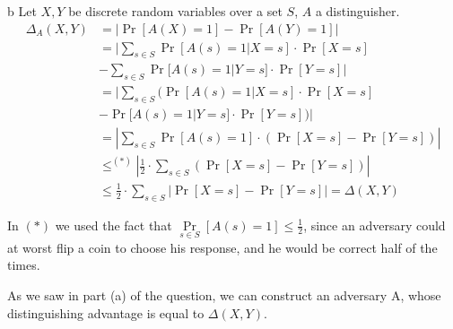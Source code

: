 \documentclass{article}
\begin{document}
\begin{paragraph}
	b Let $X, Y$ be discrete random variables over a set $S$, $A$ a distinguisher.
	\begin{align*}
		\Delta_A(X, Y) & = |\Pr[A(X) = 1] - \Pr[A(Y) = 1]|                                                    \\
		               & =|\sum\limits_{s \in S}\Pr[A(s) = 1| X = s] \cdot \Pr[X = s]                         \\
		               & - \sum\limits_{s \in S}\Pr[A(s) = 1| Y = s] \cdot \Pr[Y = s]|                        \\
		               & =|\sum\limits_{s \in S}(\Pr[A(s) = 1 | X = s] \cdot \Pr[X = s]                       \\
		               & - \Pr[A(s) = 1 | Y = s] \cdot \Pr[Y = s])|                                           \\
		               & =|\sum\limits_{s \in S}\Pr[A(s) = 1] \cdot \left(\Pr[X = s] - \Pr[Y = s]\right)|     \\
		               & \leq^{(*)} |\frac{1}{2} \cdot \sum\limits_{s \in S}(\Pr[X = s] - \Pr[Y = s])|        \\
		               & \leq \frac{1}{2} \cdot \sum\limits_{s \in S}|\Pr[X = s] - \Pr[Y = s]| = \Delta(X, Y)
	\end{align*}

	In $(*)$ we used the fact that $\Pr\limits_{s \in S}[A(s) = 1] \leq \frac{1}{2}$, since an adversary could at worst flip a coin to choose his response, and he would be correct half of the times.

	As we saw in part (a) of the question, we can construct an adversary A, whose distinguishing advantage is equal to $\Delta(X, Y)$.
\end{paragraph}
\end{document}
